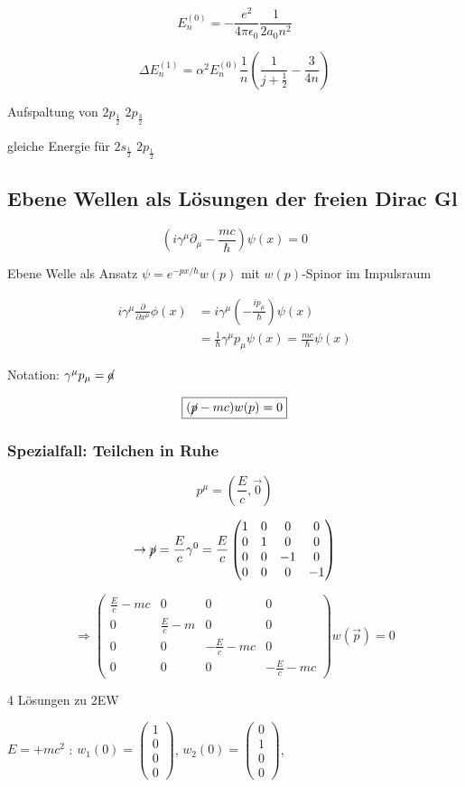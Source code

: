 \[E^{(0)}_n = -\frac{e^2}{4\pi\epsilon_0}\frac{1}{2a_0n^2}\]

\[\Delta E^{(1)}_n = \alpha^2 E^{(0)}_n \frac{1}{n}(\frac{1}{j+\frac{1}{2}}-\frac{3}{4n}) \]

Aufspaltung von \(2p_{\frac{1}{2}}\)  \(2p_{\frac{3}{2}}\)

gleiche Energie für \(2s_{\frac{1}{2}}\)  \(2p_{\frac{1}{2}}\)


\subsection{Ebene Wellen als Lösungen der freien Dirac Gl}

\[\left(i\gamma^\mu\partial_\mu-\frac{mc}{\hbar}\right)\psi(x) = 0\]

Ebene Welle als Ansatz \(\psi = e^{-px/\hbar}w(p)\) mit \(w(p)\)-Spinor im Impulsraum

\begin{align}
i\gamma^\mu\frac{\partial}{\partial x^\mu}\phi(x) &= i\gamma^\mu(-\frac{ip_\mu}{\hbar})\psi(x)\\
&=\frac{1}{\hbar}\gamma^\mu p_\mu \psi(x) = \frac{mc}{\hbar}\psi(x)
\end{align}

Notation: \(\gamma^\mu p_\mu = \cancel a\)

\[\boxed{(\cancel p - mc)w(p) = 0}\]

\subsubsection{Spezialfall: Teilchen in Ruhe}

\[p^\mu = (\frac{E}{c},\vec 0)\]


\[\rightarrow \cancel p = \frac{E}{c}\gamma^0 = \frac{E}{c} \begin{pmatrix}1&0&0&0\\ 0&1&0&0\\0&0&-1&0\\0&0&0&-1\end{pmatrix} \]

\[\Rightarrow \begin{pmatrix}\frac{E}{c}-mc&0&0&0\\ 0&\frac{E}{c}-m &0&0\\0&0&-\frac{E}{c}-mc&0\\0&0&0&-\frac{E}{c}-mc\end{pmatrix} w(\vec p) = 0\]

4 Lösungen zu 2EW

\(E=+mc^2\) : \(w_1(0) =  \begin{pmatrix}1\\0\\0\\0\end{pmatrix}\), \(w_2(0) =  \begin{pmatrix}0\\1\\0\\0\end{pmatrix}\), 

